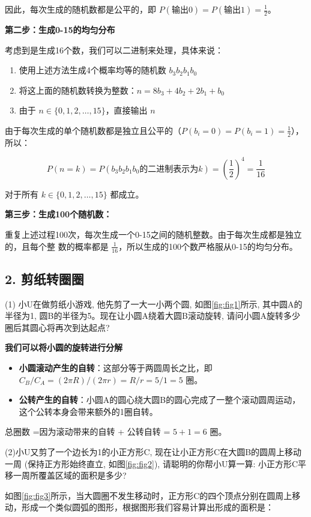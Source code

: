 \documentclass[UTF8]{ctexart}
\begin{document}
因此，每次生成的随机数都是公平的，即 $P(\text{输出0}) = P(\text{输出1}) =
\frac{1}{2}$。

\textbf{第二步：生成0-15的均匀分布}

考虑到是生成16个数，我们可以二进制来处理，具体来说：
\begin{enumerate}
    \item 使用上述方法生成4个概率均等的随机数 $b_3b_2b_1b_0$
    \item 将这上面的随机数转换为整数：$n = 8b_3 + 4b_2 + 2b_1 + b_0$
    \item 由于 $n \in \{0,1,2,\ldots,15\}$，直接输出 $n$
\end{enumerate}


由于每次生成的单个随机数都是独立且公平的（$P(b_i = 0) = P(b_i = 1) = \frac{1}{2}$），所以：

$$P(n = k) = P(b_3b_2b_1b_0 \text{的二进制表示为} k) = \left(\frac{1}{2}\right)^4 =
\frac{1}{16}$$

对于所有 $k \in \{0,1,2,\ldots,15\}$ 都成立。

\textbf{第三步：生成100个随机数：}

重复上述过程100次，每次生成一个0-15之间的随机整数。由于每次生成都是独立的，且每个整
数的概率都是 $\frac{1}{16}$，所以生成的100个数严格服从0-15的均匀分布。

\subsection*{2. 剪纸转圈圈}

(1) 小U在做剪纸小游戏, 他先剪了一大一小两个圆, 如图\ref{fig:fig1}所示, 其中圆A的半径为1, 圆B的半径为5。现在让小圆A绕着大圆B滚动旋转, 请问小圆A旋转多少圈后其圆心将再次到达起点?

\textbf{我们可以将小圆的旋转进行分解}
\begin{itemize}
    \item \textbf{小圆滚动产生的自转}：这部分等于两圆周长之比，即 $C_B / C_A = (2\pi R)/(2\pi r) = R/r = 5/1 = 5$ 圈。 
    \item \textbf{公转产生的自转}：小圆A的圆心绕大圆B的圆心完成了一整个滚动圆周运动，这个公转本身会带来额外的1圈自转。
\end{itemize}
总圈数 =因为滚动带来的自转 + 公转自转 = $5 + 1 = 6$ 圈。

(2)小U又剪了一个边长为1的小正方形C, 现在让小正方形C在大圆B的圆周上移动一周 (保持正方形始终直立, 如图\ref{fig:fig2}), 请聪明的你帮小U算一算: 小正方形C平移一周所覆盖区域的面积是多少?

如图\ref{fig:fig3}所示，当大圆圈不发生移动时，正方形C的四个顶点分别在圆周上移动，形成一个类似圆弧的图形，根据图形我们容易计算出形成的面积是：
\end{document}

